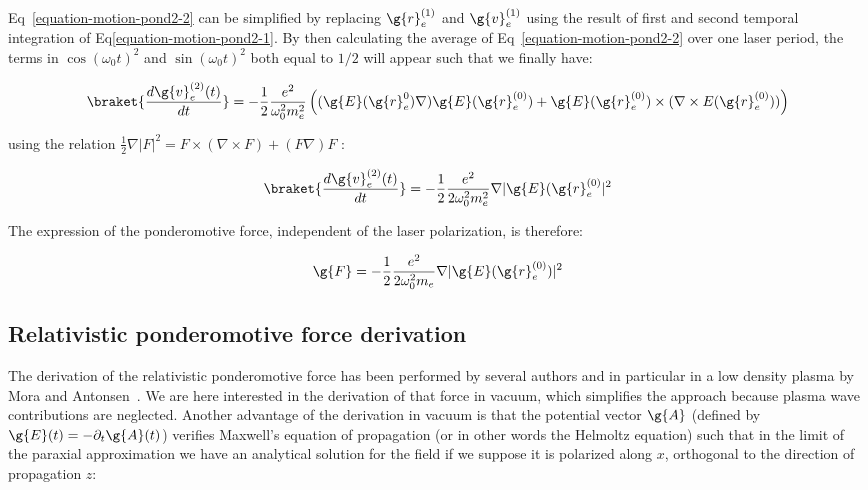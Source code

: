 \noindent Eq~\ref{equation-motion-pond2-2} can be simplified by replacing $\g{r}_e^{(1)}$ and $\g{v}_e^{(1)}$ using the result of first and second temporal integration of Eq\ref{equation-motion-pond2-1}. By then calculating the average of Eq~\ref{equation-motion-pond2-2} over one laser period, the terms in $\cos(\omega_0 t)^2$ and $\sin(\omega_0 t)^2$ both equal to $1/2$ will appear such that we finally have:


\begin{equation}
\braket{\frac{d\g{v}_e^{(2)}(t)}{dt}}=   -\frac{1}{2}\frac{e^2}{\omega_0^2 m_e^2}\left( (\g{E}(\g{r}_e^{0})\nabla) \g{E}(\g{r}_e^{(0)})+ \g{E}(\g{r}_e^{(0)})\times (\nabla\times E(\g{r}_e^{(0)}))\right)
\end{equation}


\noindent using the relation $\frac{1}{2}\nabla|F|^2  = F\times (\nabla \times F) + (F\nabla) F$ :

\begin{equation}
\braket{\frac{d\g{v}_e^{(2)}(t)}{dt}} =-\frac{1}{2}\frac{e^2}{2 \omega_0^2 m_e^2}\nabla |\g{E}(\g{r}_e^{(0)}|^2
\end{equation}

\noindent The expression of the ponderomotive force, independent of the laser polarization, is therefore:

\begin{equation}
\g{F} =-\frac{1}{2}\frac{e^2}{2 \omega_0^2 m_e}\nabla|\g{E}(\g{r}_e^{(0)})|^2
\end{equation}




\subsection{Relativistic ponderomotive force derivation}
\label{subsec:Relativistic ponderomotive force derivation}


The derivation of the relativistic ponderomotive force has been performed  by several authors and in particular in a low density plasma by Mora and Antonsen~\cite{mora1996}. We are here interested in the derivation of that force in vacuum, which simplifies the approach because plasma wave contributions are neglected. Another advantage of the derivation in vacuum is that the potential vector $\g{A}$ (defined by $\g{E}(t) = -\partial_t\g{A}(t)$) verifies Maxwell's equation of propagation (or in other words the Helmoltz equation) such that in the limit of the paraxial approximation we have an analytical solution for the field if we suppose it is polarized along $x$, orthogonal to the direction of propagation $z$:

